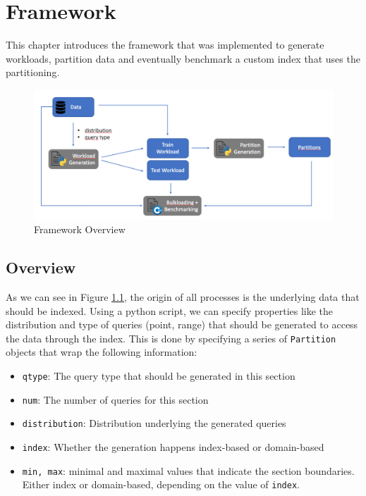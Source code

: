 \thispagestyle{plain}
\chapter{Framework}
This chapter introduces the framework that was implemented to generate workloads, partition data and eventually benchmark a custom index that uses the partitioning.
\begin{figure}[H]
    \centering
    \includegraphics[width=\textwidth]{figures/pipeline.png}
    \caption{Framework Overview}
    \label{fig:framework}
\end{figure}

\section{Overview}
As we can see in Figure \ref{fig:framework}, the origin of all processes is the underlying data that should be indexed. Using a python script, we can specify properties like the distribution and type of queries (point, range) that should be generated to access the data through the index. This is done by specifying a series of \verb|Partition| objects that wrap the following information:

\begin{minipage}{\textwidth}
\begin{itemize}
    \item \verb|qtype|: The query type that should be generated in this section
    \item \verb|num|: The number of queries for this section
    \item \verb|distribution|: Distribution underlying the generated queries
    \item \verb|index|: Whether the generation happens index-based or domain-based
    \item \verb|min, max|: minimal and maximal values that indicate the section boundaries. Either index or domain-based, depending on the value of \verb|index|.
\end{itemize}
\vspace{\parskip}
\end{minipage}

